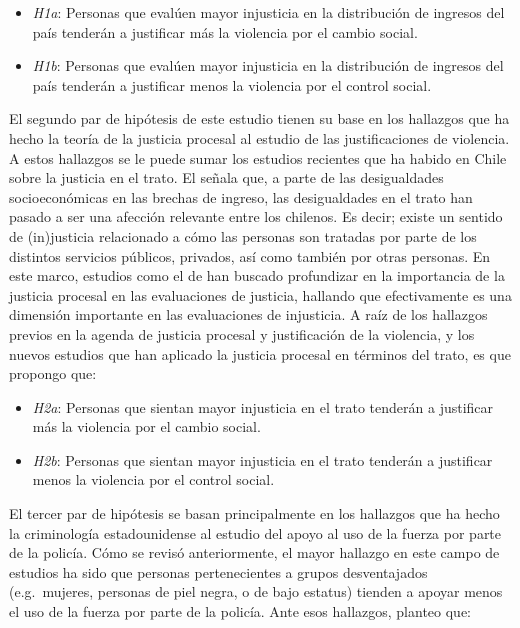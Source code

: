 \documentclass[12pt,twoside]{templates/facsothesis}
\providecommand{\tightlist}{%
  \setlength{\itemsep}{0pt}\setlength{\parskip}{0pt}}
\begin{document}
\begin{itemize}
\tightlist
\item
  \emph{H1a}: Personas que evalúen mayor injusticia en la distribución de ingresos del país tenderán a justificar más la violencia por el cambio social.
\item
  \emph{H1b}: Personas que evalúen mayor injusticia en la distribución de ingresos del país tenderán a justificar menos la violencia por el control social.
\end{itemize}

El segundo par de hipótesis de este estudio tienen su base en los hallazgos que ha hecho la teoría de la justicia procesal al estudio de las justificaciones de violencia. A estos hallazgos se le puede sumar los estudios recientes que ha habido en Chile sobre la justicia en el trato. El \citet{PNUD2017} señala que, a parte de las desigualdades socioeconómicas en las brechas de ingreso, las desigualdades en el trato han pasado a ser una afección relevante entre los chilenos. Es decir; existe un sentido de (in)justicia relacionado a cómo las personas son tratadas por parte de los distintos servicios públicos, privados, así como también por otras personas. En este marco, estudios como el de \citet{Mac-Clure2016} han buscado profundizar en la importancia de la justicia procesal en las evaluaciones de justicia, hallando que efectivamente es una dimensión importante en las evaluaciones de injusticia. A raíz de los hallazgos previos en la agenda de justicia procesal y justificación de la violencia, y los nuevos estudios que han aplicado la justicia procesal en términos del trato, es que propongo que:

\begin{itemize}
\tightlist
\item
  \emph{H2a}: Personas que sientan mayor injusticia en el trato tenderán a justificar más la violencia por el cambio social.
\item
  \emph{H2b}: Personas que sientan mayor injusticia en el trato tenderán a justificar menos la violencia por el control social.
\end{itemize}

El tercer par de hipótesis se basan principalmente en los hallazgos que ha hecho la criminología estadounidense al estudio del apoyo al uso de la fuerza por parte de la policía. Cómo se revisó anteriormente, el mayor hallazgo en este campo de estudios ha sido que personas pertenecientes a grupos desventajados (e.g.~mujeres, personas de piel negra, o de bajo estatus) tienden a apoyar menos el uso de la fuerza por parte de la policía. Ante esos hallazgos, planteo que:
\end{document}
